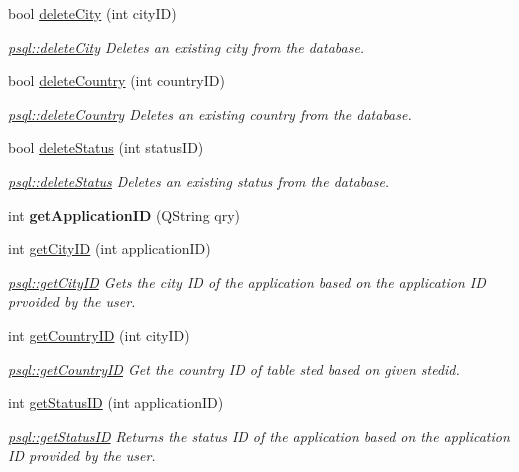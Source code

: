 \begin{DoxyCompactItemize}
bool \hyperlink{classpsql_aaffd42b26b635d9881daaf5fbf4fd62f}{delete\+City} (int city\+ID)
\begin{DoxyCompactList}\small\item\em \hyperlink{classpsql_aaffd42b26b635d9881daaf5fbf4fd62f}{psql\+::delete\+City} Deletes an existing city from the database. \end{DoxyCompactList}\item 
bool \hyperlink{classpsql_a914bf8701fbed4ff80edcd0d09c7c3fd}{delete\+Country} (int country\+ID)
\begin{DoxyCompactList}\small\item\em \hyperlink{classpsql_a914bf8701fbed4ff80edcd0d09c7c3fd}{psql\+::delete\+Country} Deletes an existing country from the database. \end{DoxyCompactList}\item 
bool \hyperlink{classpsql_a26fc592cfb9f484e1bee62af527f2b95}{delete\+Status} (int status\+ID)
\begin{DoxyCompactList}\small\item\em \hyperlink{classpsql_a26fc592cfb9f484e1bee62af527f2b95}{psql\+::delete\+Status} Deletes an existing status from the database. \end{DoxyCompactList}\item 
\mbox{\label{classpsql_a13f28a96fa9f79076ecae7d86280008f}} 
int {\bfseries get\+Application\+ID} (Q\+String qry)
\item 
int \hyperlink{classpsql_af3462a12dc106e0ca8df4fa8fcf28436}{get\+City\+ID} (int application\+ID)
\begin{DoxyCompactList}\small\item\em \hyperlink{classpsql_af3462a12dc106e0ca8df4fa8fcf28436}{psql\+::get\+City\+ID} Gets the city ID of the application based on the application ID prvoided by the user. \end{DoxyCompactList}\item 
int \hyperlink{classpsql_a81d02dc0350ba11d90257914078ba432}{get\+Country\+ID} (int city\+ID)
\begin{DoxyCompactList}\small\item\em \hyperlink{classpsql_a81d02dc0350ba11d90257914078ba432}{psql\+::get\+Country\+ID} Get the country ID of table sted based on given stedid. \end{DoxyCompactList}\item 
int \hyperlink{classpsql_a9c02c92c09cb60c35d24375673b7df06}{get\+Status\+ID} (int application\+ID)
\begin{DoxyCompactList}\small\item\em \hyperlink{classpsql_a9c02c92c09cb60c35d24375673b7df06}{psql\+::get\+Status\+ID} Returns the status ID of the application based on the application ID provided by the user. \end{DoxyCompactList}\item 

\end{DoxyCompactItemize}
